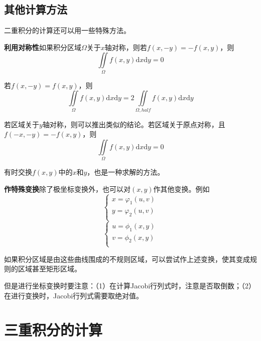 \documentclass[UTF8,openany]{book}
\begin{document}
	\subsection{其他计算方法}
	\par 二重积分的计算还可以用一些特殊方法。
	\par \textbf{利用对称性}\quad 如果积分区域$\Omega$关于$x$轴对称，则若$f(x,-y)=-f(x,y)$，则
	$$\iint\limits_{\Omega}f(x,y)\mathrm{d}x\mathrm{d}y=0$$
	\par 若$f(x,-y)=f(x,y)$，则
	$$\iint\limits_{\Omega}f(x,y)\mathrm{d}x\mathrm{d}y=2\iint\limits_{\Omega,half}f(x,y)\mathrm{d}x\mathrm{d}y$$
	\par 若区域关于$y$轴对称，则可以推出类似的结论。若区域关于原点对称，且$f(-x,-y)=-f(x,y)$，则
	$$\iint\limits_{\Omega}f(x,y)\mathrm{d}x\mathrm{d}y=0$$
	\par 有时交换$f(x,y)$中的$x$和$y$，也是一种求解的方法。
	\par \textbf{作特殊变换}\quad 除了极坐标变换外，也可以对$(x,y)$作其他变换。例如
	$$\begin{cases}
	x=\varphi_1(u,v)\\
	y=\varphi_2(u,v)\\
	\end{cases}$$
	$$\begin{cases}
	u=\phi_1(x,y)\\
	v=\phi_2(x,y)\\
	\end{cases}$$
	\par 如果积分区域是由这些曲线围成的不规则区域，可以尝试作上述变换，使其变成规则的区域甚至矩形区域。
	\par 但是进行坐标变换时要注意：（1）在计算Jacobi行列式时，注意是否取倒数；（2）在进行变换时，Jacobi行列式需要取绝对值。
	\section{三重积分的计算}
\end{document}
